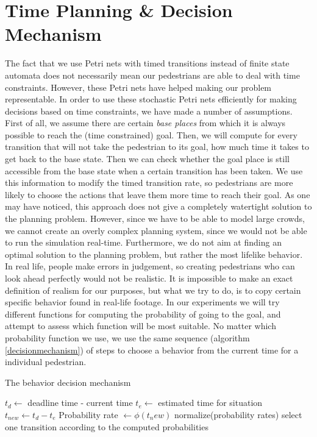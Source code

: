 \documentclass[11pt]{book}
\begin{document}
\section{Time Planning \& Decision Mechanism}
The fact that we use Petri nets with timed transitions instead of finite state automata does not necessarily mean our pedestrians are able to deal with time constraints. However, these Petri nets have helped making our problem representable. In order to use these stochastic Petri nets efficiently for making decisions based on time constraints, we have made a number of assumptions.\\
First of all, we assume there are certain \emph{base places} from which it is always possible to reach the (time constrained) goal. Then, we will compute for every transition that will not take the pedestrian to its goal, how much time it takes to get back to the base state. Then we can check whether the goal place is still accessible from the base state when a certain transition has been taken. We use this information to modify the timed transition rate, so pedestrians are more likely to choose the actions that leave them more time to reach their goal.
As one may have noticed, this approach does not give a completely watertight solution to the planning problem. However, since we have to be able to model large crowds, we cannot create an overly complex planning system, since we would not be able to run the simulation real-time. Furthermore, we do not aim at finding an optimal solution to the planning problem, but rather the most lifelike behavior. In real life, people make errors in judgement, so creating pedestrians who can look ahead perfectly would not be realistic. It is impossible to make an exact definition of realism for our purposes, but what we try to do, is to copy certain specific behavior found in real-life footage. In our experiments we will try different functions for computing the probability of going to the goal, and attempt to assess which function will be most suitable.
No matter which probability function we use, we use the same sequence (algorithm \ref{decisionmechanism}) of steps to choose a behavior from the current time for a individual pedestrian.

\begin{algorithm}
\caption{The behavior decision mechanism}
\label{decisionmechanism}
\begin{algorithmic}
\State $t_d \gets $ deadline time - current time 
\State $t_e \gets $ estimated time for situation
\State $t_{new} \gets t_d - t_e$
\State Probability rate $\gets \phi(t_new)$
\EndFor
\State normalize(probability rates)
\State select one transition according to the computed probabilities
\end{algorithmic}
\end{algorithm}
\end{document}
